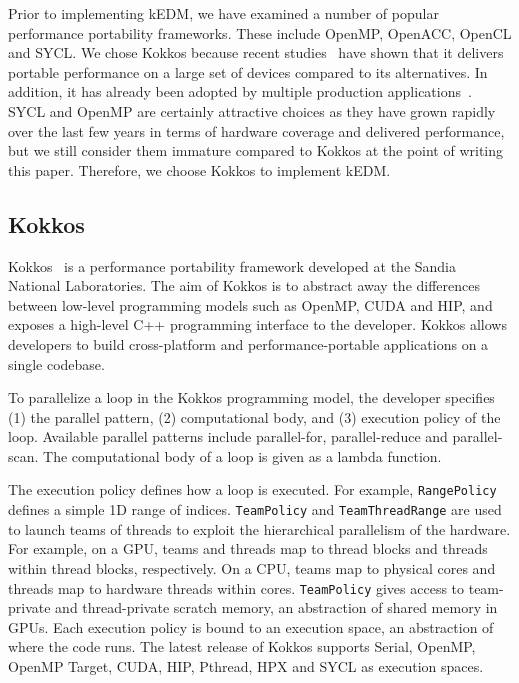 \documentclass{acmart}
\begin{document}
Prior to implementing kEDM, we have examined a number of popular performance
portability frameworks. These include OpenMP, OpenACC, OpenCL and SYCL\@. We
chose Kokkos  because recent studies~\cite{Martineau2017, Deakin2019, Deakin2020}
have shown that it delivers portable performance on a large set of devices
compared to its alternatives. In addition, it has already been adopted by
multiple production applications~\cite{Sprague2020,Holmen2017,Demeshko2019}.
SYCL and OpenMP are certainly attractive choices as they have grown rapidly over the
last few years in terms of hardware coverage and delivered performance, but we
still consider them immature compared to Kokkos at the point of writing this
paper. Therefore, we choose Kokkos to implement kEDM\@.

\subsection{Kokkos}

Kokkos~\cite{Edwards2014} is a performance portability framework developed at
the Sandia National Laboratories. The aim of Kokkos is to abstract away the
differences between low-level programming models such as OpenMP, CUDA and HIP,
and exposes a high-level C++ programming interface to the developer. Kokkos allows
developers to build cross-platform and performance-portable applications on a
single codebase.

To parallelize a loop in the Kokkos programming model, the developer specifies (1)
the parallel pattern, (2) computational body, and (3) execution policy of the
loop. Available parallel patterns include parallel-for, parallel-reduce and
parallel-scan. The computational body of a loop is given as a lambda function.

The execution policy defines how a loop is executed. For example,
\texttt{RangePolicy} defines a simple 1D range of indices. \texttt{TeamPolicy}
and \texttt{TeamThreadRange} are used to launch teams of threads to exploit
the hierarchical parallelism of the hardware. For example, on a GPU, teams and threads map
to thread blocks and threads within thread blocks, respectively. On a CPU,
teams map to physical cores and threads map to hardware threads within cores.
\texttt{TeamPolicy} gives access to team-private and thread-private scratch
memory, an abstraction of shared memory in GPUs. Each execution policy is
bound to an execution space, an abstraction of where the code runs. The latest
release of Kokkos supports Serial, OpenMP, OpenMP Target, CUDA, HIP, Pthread,
HPX and SYCL as execution spaces.
\end{document}
